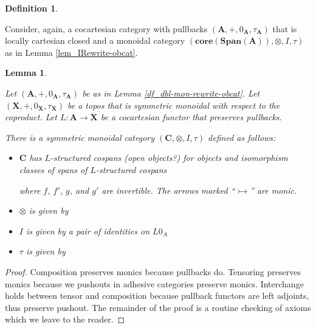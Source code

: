 \documentclass{amsart}
\newcommand{\A}{\cat{A}}
\newcommand{\C}{\cat{C}}
\newcommand{\X}{\cat{X}}
\newcommand{\core}{\mathbf{core}}
\newcommand{\cat}[1]{\mathbf{#1}}
\newcommand{\from}{\colon}
\newcommand{\diagram}[1]{\raisebox{-0.5\height}{\texttt{[image: \#1]}}}
\newcommand{\Span}{\mathbf{Span}}
\newcommand{\edit}[1]{\textcolor{editcolour}{(#1)}}
\newtheorem{lemma}[theorem]{Lemma}
\theoremstyle{remark}
\theoremstyle{definition}
\newtheorem{definition}[theorem]{Definition}
\begin{document}

\begin{definition}
  \label{def:mon-rewrite-obcat}
 
   Consider, again, a cocartesian category with pullbacks
  $ (\A , + , 0_{\A} , \tau_\A ) $
  that is locally cartesian closed and a monoidal category
  $ ( \core ( \Span ( \A )) , \otimes , I , \tau )$
  as in Lemma \ref{lem_IRewrite-obcat}.
  
\end{definition}

\begin{lemma}
  \label{thm:mon-rewrite-arrcat}
  
  Let $ (\A , + , 0_\A , \tau_\A ) $ be as in Lemma
  \ref{df_dbl-mon-rewrite-obcat}. Let $ (\X , + , 0_\X , \tau_\X ) $
  be a topos that is symmetric monoidal with respect to the
  coproduct. Let $ L \from \A \to \X $ be a cocartesian functor that
  preserves pullbacks.
	
  There is a symmetric monoidal category
  $ ( \C , \otimes , I , \tau ) $ defined as follows:
  \begin{itemize}
   \item $ \C $ has $ L $-structured cospans \edit{open objects?}
          for objects and isomorphism classes of spans of
          $ L $-structured cospans
          \begin{center}
            \diagram{diag_lr_dbl-mon-rewrite-2cell}
          \end{center}
          where $ f $, $ f' $, $ g $, and $ g' $ are invertible. The
          arrows marked ``$ \rightarrowtail $'' are monic.
   \item $ \otimes $ is given by
         \begin{center}
           \diagram{diag_lr_dbl-rewrite-tensor}
         \end{center}
   \item $ I $ is given by a pair of identities on $ L0_A $
   \item $ \tau $ is given by
        \begin{center}
          \diagram{diag_lr_dbl-rewrite-braiding}
        \end{center}
   \end{itemize}
\end{lemma}

\begin{proof}
  
  Composition preserves monics because pullbacks do. Tensoring
  preserves monics because we pushouts in adhesive categories preserve
  monics. Interchange holds between tensor and composition because
  pullback functors are left adjoints, thus preserve pushout. The
  remainder of the proof is a routine checking of axioms which we
  leave to the reader.
 
\end{proof}
\end{document}
